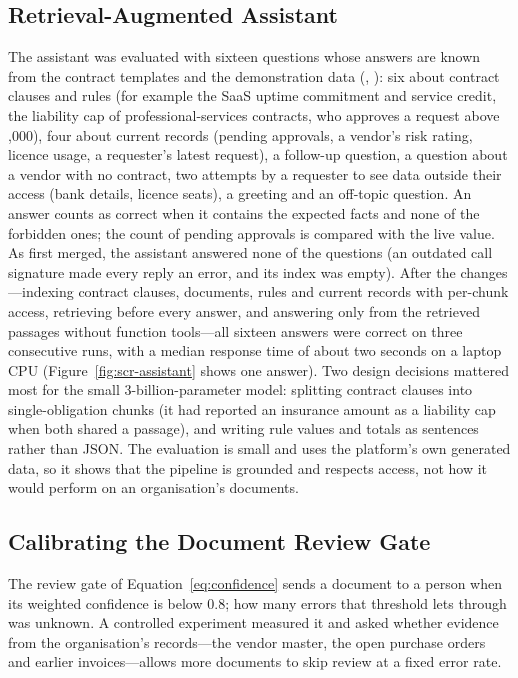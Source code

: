 \subsection{Retrieval-Augmented Assistant}\label{sec:assistant}
The assistant was evaluated with sixteen questions whose answers are known from the contract templates and the demonstration data (, ): six about contract clauses and rules (for example the SaaS uptime commitment and service credit, the liability cap of professional-services contracts, who approves a request above ,000), four about current records (pending approvals, a vendor's risk rating, licence usage, a requester's latest request), a follow-up question, a question about a vendor with no contract, two attempts by a requester to see data outside their access (bank details, licence seats), a greeting and an off-topic question. An answer counts as correct when it contains the expected facts and none of the forbidden ones; the count of pending approvals is compared with the live value. As first merged, the assistant answered none of the questions (an outdated call signature made every reply an error, and its index was empty). After the changes---indexing contract clauses, documents, rules and current records with per-chunk access, retrieving before every answer, and answering only from the retrieved passages without function tools---all sixteen answers were correct on three consecutive runs, with a median response time of about two seconds on a laptop CPU (Figure~\ref{fig:scr-assistant} shows one answer). Two design decisions mattered most for the small 3-billion-parameter model: splitting contract clauses into single-obligation chunks (it had reported an insurance amount as a liability cap when both shared a passage), and writing rule values and totals as sentences rather than JSON. The evaluation is small and uses the platform's own generated data, so it shows that the pipeline is grounded and respects access, not how it would perform on an organisation's documents.

\subsection{Calibrating the Document Review Gate}\label{sec:gate}
The review gate of Equation~\ref{eq:confidence} sends a document to a person when its weighted confidence is below 0.8; how many errors that threshold lets through was unknown. A controlled experiment measured it and asked whether evidence from the organisation's records---the vendor master, the open purchase orders and earlier invoices---allows more documents to skip review at a fixed error rate.

